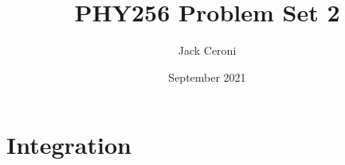\documentclass[10pt, oneside]{amsart}
\title{PHY256 Problem Set 2}
\author{Jack Ceroni}
\date{September 2021}
\begin{document}
    \maketitle

    \tableofcontents

    \vspace{.25in}

    \newpage

    \section{Integration}

    
\end{document}
